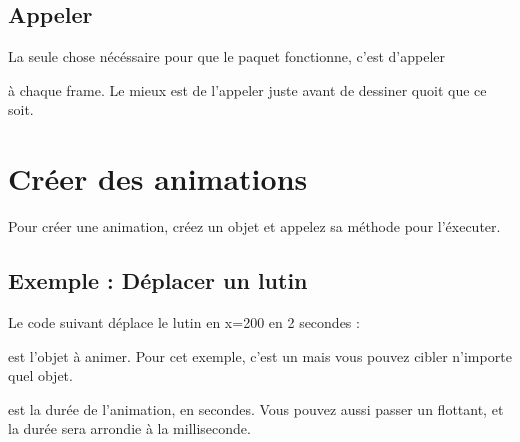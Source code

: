 \documentclass[letterpaper,10pt,french]{sphinxmanual}
\begin{document}
\subsection{Appeler }
\label{\detokenize{usage:appeler-update-animation}}
\sphinxAtStartPar
La seule chose nécéssaire pour que le paquet fonctionne, c’est d’appeler

\begin{sphinxVerbatim}[commandchars=\\\{\}]
\end{sphinxVerbatim}

\sphinxAtStartPar
à chaque frame. Le mieux est de l’appeler juste avant de dessiner quoit que ce soit.


\section{Créer des animations}
\label{\detokenize{usage:creer-des-animations}}
\sphinxAtStartPar
Pour créer une animation, créez un objet  et appelez sa méthode  pour l’éxecuter.


\subsection{Exemple : Déplacer un lutin}
\label{\detokenize{usage:exemple-deplacer-un-lutin}}
\sphinxAtStartPar
Le code suivant déplace le lutin  en x=200 en 2 secondes :

\begin{sphinxVerbatim}[commandchars=\\\{\}]
  
\end{sphinxVerbatim}

\sphinxAtStartPar
{} est l’objet à animer. Pour cet exemple, c’est un  mais vous pouvez cibler n’importe quel objet.

\sphinxAtStartPar
{} est la durée de l’animation, en secondes. Vous pouvez aussi passer un flottant, et la durée sera arrondie à la milliseconde.
\end{document}
